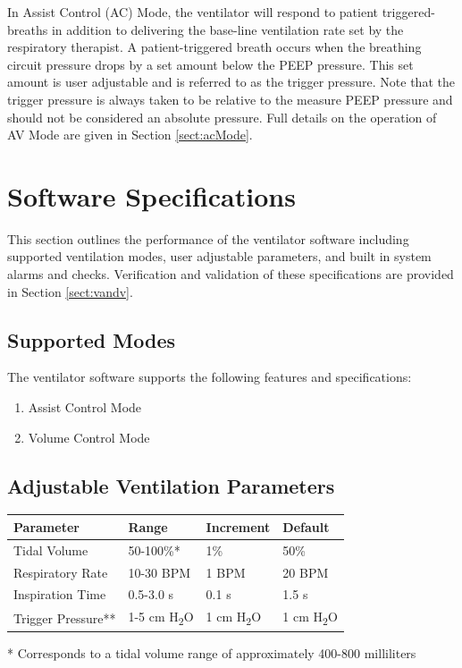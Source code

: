 \documentclass[]{article}
\begin{document}
In Assist Control (AC) Mode, the ventilator will respond to patient triggered-breaths in addition to delivering the base-line ventilation rate set by the respiratory therapist.  A patient-triggered breath occurs when the breathing circuit pressure drops by a set amount below the PEEP pressure.  This set amount is user adjustable and is referred to as the trigger pressure.  Note that the trigger pressure is always taken to be relative to the measure PEEP pressure and should not be considered an absolute pressure.  Full details on the operation of AV Mode are given in Section \ref{sect:acMode}.

\section{Software Specifications}

This section outlines the performance of the ventilator software including supported ventilation modes, user adjustable parameters, and built in system alarms and checks.  Verification and validation of these specifications are provided in Section \ref{sect:vandv}.
\subsection{Supported Modes}

The ventilator software supports the following features and specifications:
\begin{enumerate}
	\item Assist Control Mode
	\item Volume Control Mode
\end{enumerate}




\subsection{Adjustable Ventilation Parameters}


\begin{center}
	\begin{tabular}{ |p{3.8cm}| p{2.2cm}| p{2.2cm}|p{2.2cm}|}
		\hline
		\textbf{Parameter} & \textbf{Range} & \textbf{Increment}& \textbf{Default} \\
		\hline 
		Tidal Volume & 50-100\%* & 1\% & 50\% \\  
		\hline
		Respiratory Rate & 10-30 BPM  & 1 BPM & 20 BPM \\ 
		\hline   
		Inspiration Time & 0.5-3.0 s& 0.1 s & 1.5 s\\
		\hline
		Trigger Pressure** & 1-5 cm H\textsubscript{2}O & 1 cm H\textsubscript{2}O& 1 cm H\textsubscript{2}O \\
		\hline
	\end{tabular}
	
\end{center}
* Corresponds to a tidal volume range of approximately 400-800 milliliters
\end{document}
